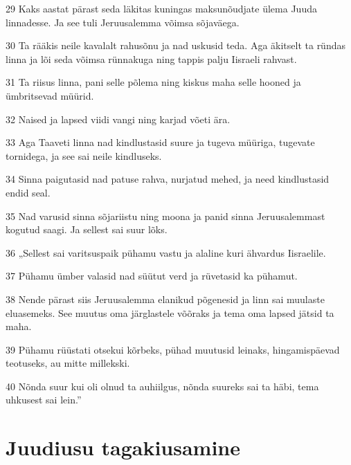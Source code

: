 \par 29 Kaks aastat pärast seda läkitas kuningas maksunõudjate ülema Juuda linnadesse. Ja see tuli Jeruusalemma võimsa sõjaväega.
\par 30 Ta rääkis neile kavalalt rahusõnu ja nad uskusid teda. Aga äkitselt ta ründas linna ja lõi seda võimsa rünnakuga ning tappis palju Iisraeli rahvast.
\par 31 Ta riisus linna, pani selle põlema ning kiskus maha selle hooned ja ümbritsevad müürid.
\par 32 Naised ja lapsed viidi vangi ning karjad võeti ära.
\par 33 Aga Taaveti linna nad kindlustasid suure ja tugeva müüriga, tugevate tornidega, ja see sai neile kindluseks.
\par 34 Sinna paigutasid nad patuse rahva, nurjatud mehed, ja need kindlustasid endid seal.
\par 35 Nad varusid sinna sõjariistu ning moona ja panid sinna Jeruusalemmast kogutud saagi. Ja sellest sai suur lõks.
\par 36 „Sellest sai varitsuspaik pühamu vastu ja alaline kuri ähvardus Iisraelile.
\par 37 Pühamu ümber valasid nad süütut verd ja rüvetasid ka pühamut.
\par 38 Nende pärast siis Jeruusalemma elanikud põgenesid ja linn sai muulaste eluasemeks. See muutus oma järglastele võõraks ja tema oma lapsed jätsid ta maha.
\par 39 Pühamu rüüstati otsekui kõrbeks, pühad muutusid leinaks, hingamispäevad teotuseks, au mitte millekski.
\par 40 Nõnda suur kui oli olnud ta auhiilgus, nõnda suureks sai ta häbi, tema uhkusest sai lein.” 

\section*{Juudiusu tagakiusamine}


